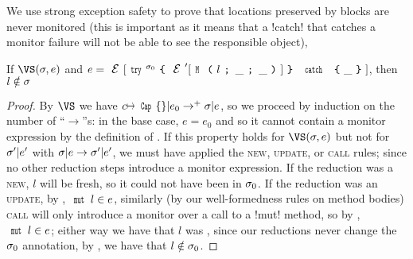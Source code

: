 We use strong exception safety to prove that locations preserved by \Q@try@ blocks are never monitored (this is important as it means that a \Q!catch! that catches a monitor failure will not be able to see the responsible object),%
\SS\begin{Lemma}
	If $\VS(\s, e)$ and $e = \E[\trys{\s_0}{\E'[\M{l}{\_}{\_}]}{\_}]$, then $l \notin \sigma$
\end{Lemma}\SS
\begin{proof}
By $\VS$ we have $c\mapsto\Kw{Cap}\{\}|e_0\rightarrow^+ \s|e$, so we proceed by induction on the number of ``$\rightarrow$''s: in the base case, $e = e_0$ and so it cannot contain a monitor expression by the definition of \VS. If this property holds for $\VS(\s, e)$ but not for $\sigma'|e'$ with $\sigma|e\rightarrow \sigma'|e'$, we must have applied the \textsc{new}, \textsc{update}, or \textsc{call} rules; since no other reduction steps introduce a monitor expression. If the reduction was a \textsc{new}, $l$ will be fresh, so it could not have been in $\sigma_0$. If the reduction was an \textsc{update}, by , $\Kw{mut}\,l \in e$, similarly (by our well-formedness rules on method bodies) \textsc{call} will only introduce a monitor over a call to a \Q!mut! method, so by , $\Kw{mut}\,l \in e$; either way we have that $l$ was \muty, since our reductions never change the $\sigma_0$ annotation, by , we have that $l \notin \sigma_0$.
\end{proof}

